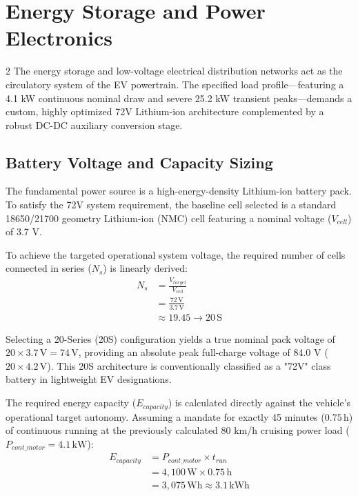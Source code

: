 \section{Energy Storage and Power Electronics}

\begin{multicols}{2}
The energy storage and low-voltage electrical distribution networks act as the circulatory system of the EV powertrain. The specified load profile—featuring a 4.1 kW continuous nominal draw and severe 25.2 kW transient peaks—demands a custom, highly optimized 72V Lithium-ion architecture complemented by a robust DC-DC auxiliary conversion stage.

\subsection{Battery Voltage and Capacity Sizing}

The fundamental power source is a high-energy-density Lithium-ion battery pack. To satisfy the 72V system requirement, the baseline cell selected is a standard 18650/21700 geometry Lithium-ion (NMC) cell featuring a nominal voltage ($V_{cell}$) of 3.7 V. 

To achieve the targeted operational system voltage, the required number of cells connected in series ($N_s$) is linearly derived:
\begin{equation} \label{eq:series_config}
\begin{split}
N_s &= \frac{V_{target}}{V_{cell}} \\
&= \frac{72\,\mathrm{V}}{3.7\,\mathrm{V}} \\
&\approx 19.45 \rightarrow 20\,\mathrm{S}
\end{split}
\end{equation}

Selecting a 20-Series (20S) configuration yields a true nominal pack voltage of $20 \times 3.7\,\mathrm{V} = 74\,\mathrm{V}$, providing an absolute peak full-charge voltage of 84.0 V ($20 \times 4.2\,\mathrm{V}$). This 20S architecture is conventionally classified as a "72V" class battery in lightweight EV designations.

The required energy capacity ($E_{capacity}$) is calculated directly against the vehicle's operational target autonomy. Assuming a mandate for exactly 45 minutes ($0.75\,\mathrm{h}$) of continuous running at the previously calculated 80 km/h cruising power load ($P_{cont\_motor} = 4.1\,\mathrm{kW}$):
\begin{equation} \label{eq:energy_capacity}
\begin{split}
E_{capacity} &= P_{cont\_motor} \times t_{run} \\
&= 4,100\,\mathrm{W} \times 0.75\,\mathrm{h} \\
&= 3,075\,\mathrm{Wh} \approx 3.1\,\mathrm{kWh}
\end{split}
\end{equation}


\end{multicols}
